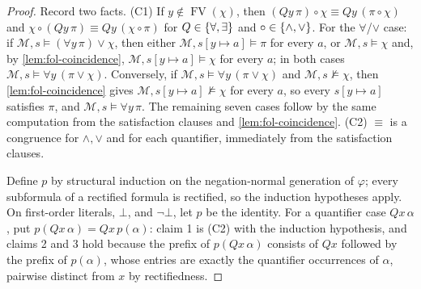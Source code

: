 \documentclass[11pt,oneside,openany]{book}
\theoremstyle{definition}
\theoremstyle{plain}
\theoremstyle{remark}
\DeclarePairedDelimiter{\set}{\lbrace}{\rbrace}
\newcommand{\Meta}{\mathcal{M}}
\newcommand{\FV}{\operatorname{FV}}
\newcommand{\entails}{\models}
\newcommand{\notentails}{\not\models}
\newcommand{\bottom}{\bot}
\begin{document}
\begin{proof}
Record two facts.  (C1) If \(y\notin\FV(\chi)\), then
\((Qy\,\pi)\circ\chi\equiv Qy\,(\pi\circ\chi)\) and
\(\chi\circ(Qy\,\pi)\equiv Qy\,(\chi\circ\pi)\) for
\(Q\in\set{\forall,\exists}\) and \(\circ\in\set{\land,\lor}\).  For the
\(\forall\)/\(\lor\) case: if
\(\Meta,s\entails(\forall y\,\pi)\lor\chi\), then either
\(\Meta,s[y\mapsto a]\entails\pi\) for every \(a\), or
\(\Meta,s\entails\chi\) and, by \cref{lem:fol-coincidence},
\(\Meta,s[y\mapsto a]\entails\chi\) for every \(a\); in both cases
\(\Meta,s\entails\forall y\,(\pi\lor\chi)\).  Conversely, if
\(\Meta,s\entails\forall y\,(\pi\lor\chi)\) and
\(\Meta,s\notentails\chi\), then \cref{lem:fol-coincidence} gives
\(\Meta,s[y\mapsto a]\notentails\chi\) for every \(a\), so every
\(s[y\mapsto a]\) satisfies \(\pi\), and
\(\Meta,s\entails\forall y\,\pi\).  The remaining seven cases follow by
the same computation from the satisfaction clauses and
\cref{lem:fol-coincidence}.  (C2) \(\equiv\) is a congruence for
\(\land,\lor\) and for each quantifier, immediately from the
satisfaction clauses.

Define \(p\) by structural induction on the negation-normal generation
of \(\varphi\); every subformula of a rectified formula is rectified, so
the induction hypotheses apply.  On first-order literals, \(\bottom\),
and \(\neg\bottom\), let \(p\) be the identity.  For a quantifier case
\(Qx\,\alpha\), put \(p(Qx\,\alpha)=Qx\,p(\alpha)\): claim 1 is (C2) with
the induction hypothesis, and claims 2 and 3 hold because the prefix of
\(p(Qx\,\alpha)\) consists of \(Qx\) followed by the prefix of
\(p(\alpha)\), whose entries are exactly the quantifier occurrences of
\(\alpha\), pairwise distinct from \(x\) by rectifiedness.


\end{proof}
\end{document}
